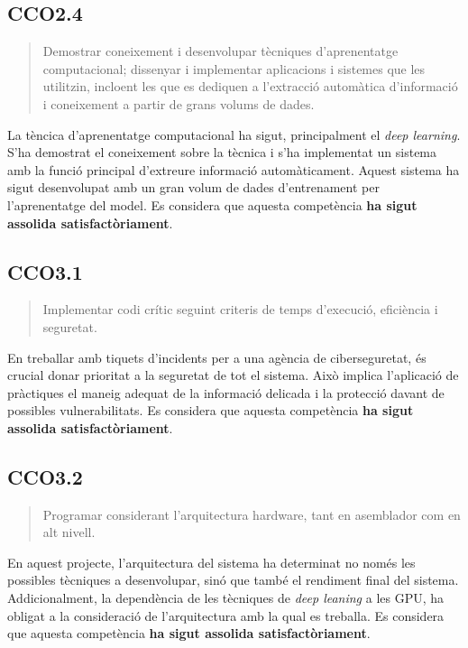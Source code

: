 \subsection*{CCO2.4}
\begin{quote}
    Demostrar coneixement i desenvolupar tècniques d'aprenentatge computacional; dissenyar i implementar aplicacions i sistemes que les utilitzin, incloent les que es dediquen a l'extracció automàtica d'informació i coneixement a partir de grans volums de dades.
\end{quote}
La tèncica d'aprenentatge computacional ha sigut, principalment el \textit{deep learning}. S'ha demostrat el coneixement sobre la tècnica i s'ha implementat un sistema amb la funció principal d'extreure informació automàticament. Aquest sistema ha sigut desenvolupat amb un gran volum de dades d'entrenament per l'aprenentatge del model. Es considera que aquesta competència \textbf{ha sigut assolida satisfactòriament}.

\subsection*{CCO3.1}
\begin{quote}
    Implementar codi crític seguint criteris de temps d'execució, eficiència i seguretat.
\end{quote}
En treballar amb tiquets d'incidents per a una agència de ciberseguretat, és crucial donar prioritat a la seguretat de tot el sistema. Això implica l'aplicació de pràctiques el maneig adequat de la informació delicada i la protecció davant de possibles vulnerabilitats. Es considera que aquesta competència \textbf{ha sigut assolida satisfactòriament}.

\subsection*{CCO3.2}
\begin{quote}
    Programar considerant l'arquitectura hardware, tant en asemblador com en alt nivell.
\end{quote}
En aquest projecte, l'arquitectura del sistema ha determinat no només les possibles tècniques a desenvolupar, sinó que també el rendiment final del sistema. Addicionalment, la dependència de les tècniques de \textit{deep leaning} a les GPU, ha obligat a la consideració de l'arquitectura amb la qual es treballa. Es considera que aquesta competència \textbf{ha sigut assolida satisfactòriament}.
